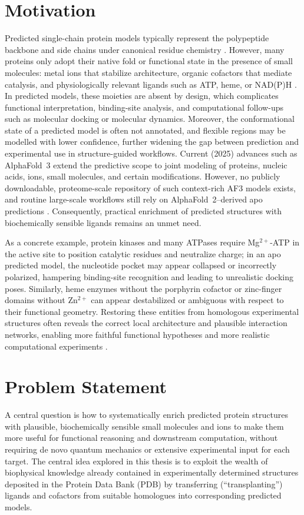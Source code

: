 \section{Motivation}
Predicted single-chain protein models typically represent the polypeptide backbone and side chains under canonical residue chemistry \cite{AlphaFoldServer}. However, many proteins only adopt their native fold or functional state in the presence of small molecules: metal ions that stabilize architecture, organic cofactors that mediate catalysis, and physiologically relevant ligands such as ATP, heme, or NAD(P)H \cite{tangCharacterizationCofactorInducedFolding2009,xiaoNADHNADPHRedox2018}. In predicted models, these moieties are absent by design, which complicates functional interpretation, binding-site analysis, and computational follow-ups such as molecular docking or molecular dynamics. Moreover, the conformational state of a predicted model is often not annotated, and flexible regions may be modelled with lower confidence, further widening the gap between prediction and experimental use in structure-guided workflows.
Current (2025) advances such as AlphaFold~3 extend the predictive scope to joint modeling of proteins, nucleic acids, ions, small molecules, and certain modifications. However, no publicly downloadable, proteome-scale repository of such context-rich AF3 models exists, and routine large-scale workflows still rely on AlphaFold~2--derived apo predictions \cite{abramsonAccurateStructurePrediction2024}. Consequently, practical enrichment of predicted structures with biochemically sensible ligands remains an unmet need.

As a concrete example, protein kinases and many ATPases require Mg$^{2+}$-ATP in the active site to position catalytic residues and neutralize charge; in an apo predicted model, the nucleotide pocket may appear collapsed or incorrectly polarized, hampering binding-site recognition and leading to unrealistic docking poses. Similarly, heme enzymes without the porphyrin cofactor or zinc-finger domains without Zn$^{2+}$ can appear destabilized or ambiguous with respect to their functional geometry. Restoring these entities from homologous experimental structures often reveals the correct local architecture and plausible interaction networks, enabling more faithful functional hypotheses and more realistic computational experiments \cite{hekkelmanAlphaFillEnrichingAlphaFold2023}.

\section{Problem Statement}
A central question is how to systematically enrich predicted protein structures with plausible, biochemically sensible small molecules and ions to make them more useful for functional reasoning and downstream computation, without requiring de novo quantum mechanics or extensive experimental input for each target. The central idea explored in this thesis is to exploit the wealth of biophysical knowledge already contained in experimentally determined structures deposited in the Protein Data Bank (PDB) \cite{burleyRCSBProteinData2019} by transferring (``transplanting'') ligands and cofactors from suitable homologues into corresponding predicted models.

